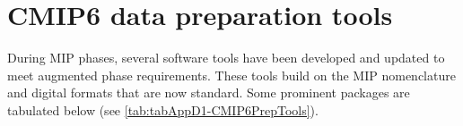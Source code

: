 \documentclass[gmd, preprint]{copernicus}
\newcommand{\mycomment}[1]{}
\begin{document}
\mycomment{
What do we need DOI'd - can zenodo work?
CMIP2: https://pcmdi.llnl.gov/mips/cmip2/
CMIP3: https://pcmdi.llnl.gov/mips/cmip3/experiment.html
CMIP5: https://pcmdi.llnl.gov/mips/cmip5/requirements.html
standard_output doc - with coverpage (Karl)
ODS2.5: Gleckler et al. 2024 https://docs.google.com/document/d/1bTi5-CKR8xBCA4e3egc4FXJ93LuUfrhyEBHpUCVgZuo/edit
Also Potter et al. 2011 https://doi.org/10.1175/2011BAMS3018.1
}


\section{CMIP6 data preparation tools}    %
\label{sec:secAppD1-CMIP6DataPrep}

During MIP phases, several software tools have been developed and updated to meet augmented phase requirements. These tools build on the MIP nomenclature and digital formats that are now standard. Some prominent packages are tabulated below (see \autoref{tab:tabAppD1-CMIP6PrepTools}).
\end{document}
